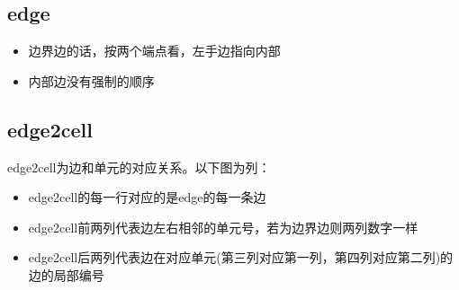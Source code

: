 \subsection{edge}
\begin{itemize}
	\item 边界边的话，按两个端点看，左手边指向内部
	\item 内部边没有强制的顺序
\end{itemize}
\subsection{edge2cell}
edge2cell为边和单元的对应关系。以下图为列：
\begin{itemize}
	\item edge2cell的每一行对应的是edge的每一条边
	\item edge2cell前两列代表边左右相邻的单元号，若为边界边则两列数字一样
	\item edge2cell后两列代表边在对应单元(第三列对应第一列，第四列对应第二列)的边的局部编号
\end{itemize}

